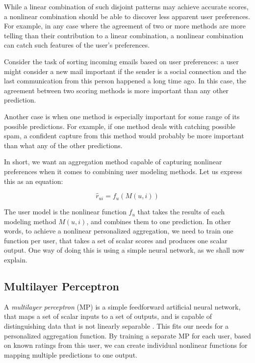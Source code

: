 While a linear combination of such disjoint patterns may achieve accurate scores,
a nonlinear combination should be able to discover less apparent user preferences.
For example, in any case where the agreement of two or more methods are more telling than their contribution
to a linear combination, a nonlinear combination can catch such features of the user's preferences.

Consider the task of sorting incoming emails based on user preferences: 
a user might consider a new mail important if the sender is a social connection
and the last communication from this person happened a long time ago. 
In this case, the agreement between two scoring methods is more important
than any other prediction.

Another case is when one method is especially important for some 
range of its possible predictions. For example, if one method deals with catching possible spam,
a confident capture from this method would probably be more important than 
what any of the other predictions.

In short, we want an aggregation method capable of capturing nonlinear preferences
when it comes to combining user modeling methods.
Let us express this as an equation:

\begin{equation*}
  \hat{r}_{ui} = f_{u}(M(u,i))
\end{equation*}

The user model is the nonlinear function $f_u$ that takes the results of each modeling method $M(u,i)$,
and combines them to one prediction.
In other words, to achieve a nonlinear personalized aggregation, we need to train one function per user,
that takes a set of scalar scores and produces one scalar output.
One way of doing this is using a simple neural network, as we shall now explain.

\subsection{Multilayer Perceptron}

A \emph{multilayer perceptron} (MP) is a simple 
feedforward artificial neural network,
that maps a set of scalar inputs to a set of outputs,
and is capable of distinguishing data that is not linearly separable
\cite[p578]{Russell1995}.
This fits our needs for a personalized aggregation function.
By training a separate MP for each user, based on known ratings from this user,
we can create individual nonlinear functions for mapping multiple 
predictions to one output.

